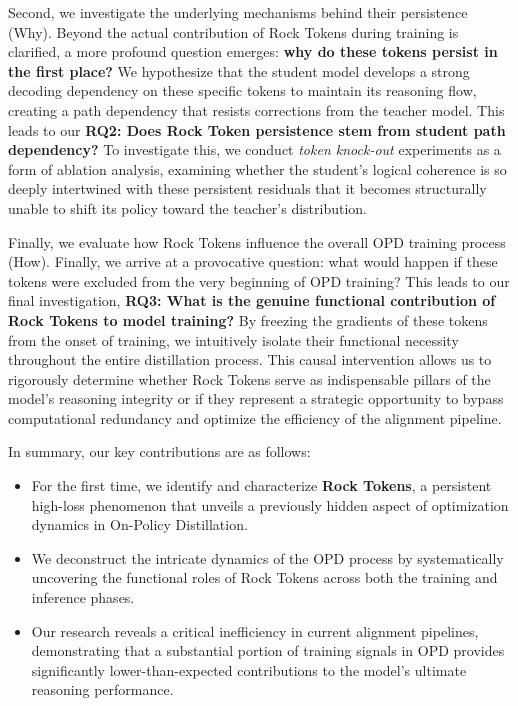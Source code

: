 Second, we investigate the underlying mechanisms behind their persistence (Why). Beyond the actual contribution of Rock Tokens during training is clarified, a more profound question emerges: \textbf{why do these tokens persist in the first place?} We hypothesize that the student model develops a strong decoding dependency on these specific tokens to maintain its reasoning flow, creating a path dependency that resists corrections from the teacher model. This leads to our \textbf{RQ2: Does Rock Token persistence stem from student path dependency?} To investigate this, we conduct \textit{token knock-out} experiments as a form of ablation analysis, examining whether the student's logical coherence is so deeply intertwined with these persistent residuals that it becomes structurally unable to shift its policy toward the teacher's distribution.

Finally, we evaluate how Rock Tokens influence the overall OPD training process (How). Finally, we arrive at a provocative question: what would happen if these tokens were excluded from the very beginning of OPD training? This leads to our final investigation, \textbf{RQ3: What is the genuine functional contribution of Rock Tokens to model training?} By freezing the gradients of these tokens from the onset of training, we intuitively isolate their functional necessity throughout the entire distillation process. This causal intervention allows us to rigorously determine whether Rock Tokens serve as indispensable pillars of the model's reasoning integrity or if they represent a strategic opportunity to bypass computational redundancy and optimize the efficiency of the alignment pipeline.

In summary, our key contributions are as follows:


\begin{itemize}[leftmargin=*,itemsep=1pt]
    \vspace{-2mm}
    \item For the first time, we identify and characterize \textbf{Rock Tokens}, a persistent high-loss phenomenon that unveils a previously hidden aspect of optimization dynamics in On-Policy Distillation.
    \vspace{-1mm}
    \item We deconstruct the intricate dynamics of the OPD process by systematically uncovering the functional roles of Rock Tokens across both the training and inference phases.
    \vspace{-1mm}
    \item Our research reveals a critical inefficiency in current alignment pipelines, demonstrating that a substantial portion of training signals in OPD provides significantly lower-than-expected contributions to the model's ultimate reasoning performance.
\end{itemize}
